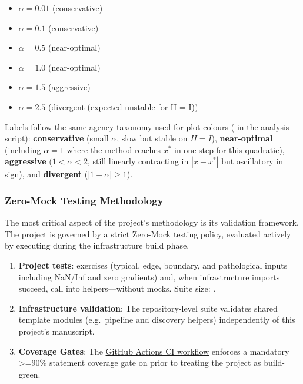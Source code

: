 \documentclass[
  english,
]{article}
\providecommand{\tightlist}{%
  \setlength{\itemsep}{0pt}\setlength{\parskip}{0pt}}
\begin{document}
\begin{itemize}
\tightlist
\item
  \(\alpha = 0.01\) (conservative)
\item
  \(\alpha = 0.1\) (conservative)
\item
  \(\alpha = 0.5\) (near-optimal)
\item
  \(\alpha = 1.0\) (near-optimal)
\item
  \(\alpha = 1.5\) (aggressive)
\item
  \(\alpha = 2.5\) (divergent (expected unstable for H = I))
\end{itemize}

Labels follow the same agency taxonomy used for plot colours
( in the analysis script):
\textbf{conservative} (small \(\alpha\), slow but stable on \(H=I\)),
\textbf{near-optimal} (including \(\alpha=1\) where the method reaches
\(x^\ast\) in one step for this quadratic), \textbf{aggressive}
(\(1 < \alpha < 2\), still linearly contracting in \(|x-x^\ast|\) but
oscillatory in sign), and \textbf{divergent} (\(|1-\alpha| \geq 1\)).

\subsubsection{Zero-Mock Testing
Methodology}\label{zero-mock-testing-methodology}

The most critical aspect of the project's methodology is its validation
framework. The project is governed by a strict Zero-Mock testing policy,
evaluated actively by executing
during the infrastructure build phase.

\begin{enumerate}
\def\labelenumi{\arabic{enumi}.}
\tightlist
\item
  \textbf{Project tests}:
  \href{../tests/test_optimizer.py}{}
  exercises  (typical, edge, boundary, and
  pathological inputs including NaN/Inf and zero gradients) and, when
  infrastructure imports succeed, call into
   helpers---without mocks. Suite
  size:
  \href{../../../../docs/_generated/COUNTS.md}{}.
\item
  \textbf{Infrastructure validation}: The repository-level
   suite validates shared template modules
  (e.g.~pipeline and discovery helpers) independently of this project's
  manuscript.
\item
  \textbf{Coverage Gates}: The
  \href{https://github.com/docxology/template/blob/main/.github/workflows/ci.yml}{GitHub
  Actions CI workflow} enforces a mandatory \texorpdfstring{\textgreater{}=}{>=}90\% statement coverage
  gate on  prior
  to treating the project as build-green.
\end{enumerate}
\end{document}
